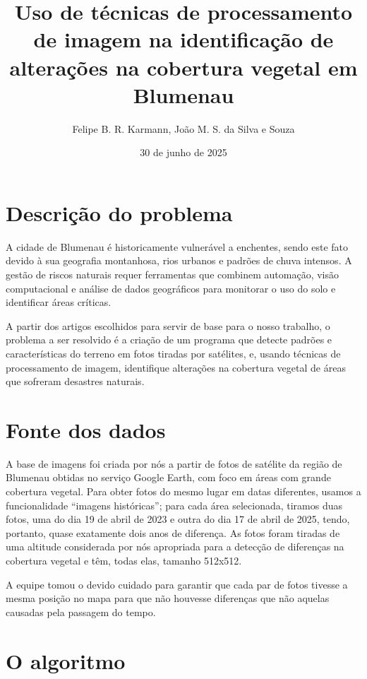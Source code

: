 \documentclass{article}
\author{Felipe B. R. Karmann, João M. S. da Silva e Souza}
\date{30 de junho de 2025}
\title{Uso de técnicas de processamento de imagem na identificação de alterações na cobertura vegetal em Blumenau}
\begin{document}
\maketitle

\section{Descrição do problema}

A cidade de Blumenau é historicamente vulnerável a enchentes, sendo este fato devido à sua geografia montanhosa, rios urbanos e padrões de chuva intensos. A gestão de riscos naturais requer ferramentas que combinem automação, visão computacional e análise de dados geográficos para monitorar o uso do solo e identificar áreas críticas.

A partir dos artigos escolhidos para servir de base para o nosso trabalho, o problema a ser resolvido é a criação de um programa que detecte padrões e características do terreno em fotos tiradas por satélites, e, usando técnicas de processamento de imagem, identifique alterações na cobertura vegetal de áreas que sofreram desastres naturais.

\section{Fonte dos dados}

A base de imagens foi criada por nós a partir de fotos de satélite da região de Blumenau obtidas no serviço Google Earth, com foco em áreas com grande cobertura vegetal. Para obter fotos do mesmo lugar em datas diferentes, usamos a funcionalidade ``imagens históricas''; para cada área selecionada, tiramos duas fotos, uma do dia 19 de abril de 2023 e outra do dia 17 de abril de 2025, tendo, portanto, quase exatamente dois anos de diferença. As fotos foram tiradas de uma altitude considerada por nós apropriada para a detecção de diferenças na cobertura vegetal e têm, todas elas, tamanho 512x512.

A equipe tomou o devido cuidado para garantir que cada par de fotos tivesse a mesma posição no mapa para que não houvesse diferenças que não aquelas causadas pela passagem do tempo.

\section{O algoritmo}
\end{document}
